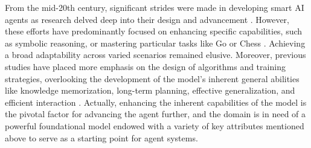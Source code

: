 \documentclass{article}
\begin{document}
From the mid-20th century, significant strides were made in developing smart AI agents as research delved deep into their design and advancement \cite{DBLP:conf/ijcai/FikesN71,DBLP:conf/ijcai/Sacerdoti73,brooks1991intelligence,maes1990designing,ribeiro2002reinforcement,kaelbling1996reinforcement}.
However, these efforts have predominantly focused on enhancing specific capabilities, such as symbolic reasoning, or mastering particular tasks like Go or Chess \cite{Guha_Lenat_1994,kaelbling1987architecture,sutton2018reinforcement}.
Achieving a broad adaptability across varied scenarios remained elusive.
Moreover, previous studies have placed more emphasis on the design of algorithms and training strategies, overlooking the development of the model's inherent general abilities like knowledge memorization, long-term planning, effective generalization, and efficient interaction \cite{DBLP:journals/corr/abs-2304-03442,DBLP:journals/corr/abs-2305-13246}. 
Actually, enhancing the inherent capabilities of the model is the pivotal factor for advancing the agent further, and the domain is in need of a powerful foundational model endowed with a variety of key attributes mentioned above to serve as a starting point for agent systems.
\end{document}
